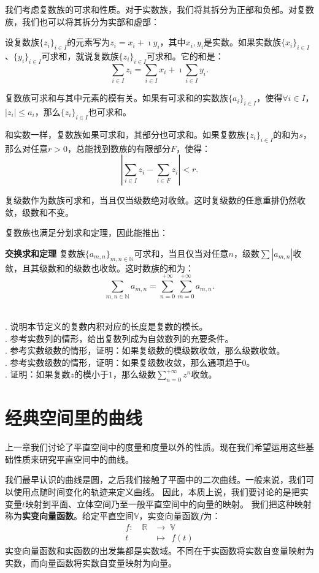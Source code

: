 \documentclass[12pt,UTF8,fontset=none]{ctexbook}
\begin{document}
我们考虑复数族的可求和性质。对于实数族，我们将其拆分为正部和负部。对复数族，我们也可以将其拆分为实部和虚部：
\begin{tm}
    设复数族$\{z_i\}_{i\in I}$的元素写为$z_i = x_i + \imath y_i $，其中$x_i, y_i$是实数。如果实数族$\{x_i\}_{i\in I}$、$\{y_i\}_{i\in I}$可求和，就说复数族$\{z_i\}_{i\in I}$可求和。它的和是：
    $$ \sum_{i\in I} z_i = \sum_{i\in I} x_i + \imath \sum_{i\in I} y_i. $$
\end{tm}
复数族可求和与其中元素的模有关。如果有可求和的实数族$\{a_i\}_{i\in I}$，使得$\forall i\in I$，$|z_i| \leqslant a_i$，那么$\{z_i\}_{i\in I}$也可求和。

和实数一样，复数族如果可求和，其部分也可求和。如果复数族$\{z_i\}_{i\in I}$的和为$s$，那么对任意$r>0$，总能找到数族的有限部分$F$，使得：
$$ \left| \sum_{i\in I} z_i - \sum_{i\in F} z_i \right| < r. $$

复级数作为数族可求和，当且仅当级数绝对收敛。这时复级数的任意重排仍然收敛，级数和不变。

复数族也满足分划求和定理，因此能推出：
\begin{tm}{\textbf{交换求和定理}}
    复数族$\{a_{m,n}\}_{m,n\in\mathbb{N}}$可求和，当且仅当对任意$n$，级数$\sum |a_{m,n}|$收敛，且其级数和的级数也收敛。这时数族的和为：
    $$ \sum_{m,n\in\mathbb{N}} a_{m,n} = \sum_{n=0}^{+\infty} \sum_{m=0}^{+\infty} a_{m,n}. $$
\end{tm}

\begin{xt}
    \mbox{} \\
    . 说明本节定义的复数内积对应的长度是复数的模长。\\
    . 参考实数列的情形，给出复数列成为自敛数列的充要条件。\\ 
    . 参考实数级数的情形，证明：如果复级数的模级数收敛，那么级数收敛。\\
    . 参考实数级数的情形，证明：如果复级数收敛，那么通项趋于$0$。\\
    . 证明：如果复数$z$的模小于$1$，那么级数$\sum_{n=0}^{+\infty} z^n$收敛。
\end{xt}

\chapter{经典空间里的曲线}

上一章我们讨论了平直空间中的度量和度量以外的性质。现在我们希望运用这些基础性质来研究平直空间中的曲线。

我们最早认识的曲线是圆，之后我们接触了平面中的二次曲线。一般来说，我们可以使用点随时间变化的轨迹来定义曲线。
因此，本质上说，我们要讨论的是把实变量$t$映射到平面、立体空间乃至一般平直空间中的向量的映射。
我们把这种映射称为\textbf{实变向量函数}。给定平直空间$\mathbb{V}$，实变向量函数$f$为：
\begin{align*}
    f: \quad \mathbb{R} &\rightarrow \; \mathbb{V} \\
      t \; &\mapsto \;\,f(t)
\end{align*}
实变向量函数和实函数的出发集都是实数域。不同在于实函数将实数自变量映射为实数，而向量函数将实数自变量映射为向量。
\end{document}

